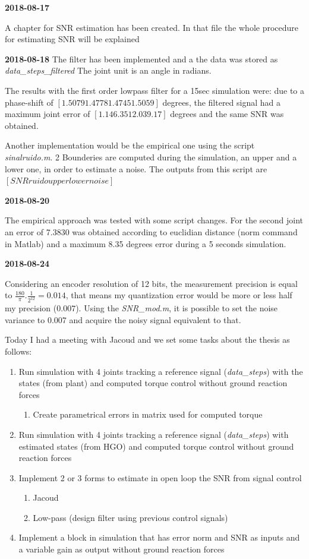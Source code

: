 \textbf{2018-08-17}

A chapter for SNR estimation has been created. In that file the whole procedure for estimating SNR will be explained 

\textbf{2018-08-18}
The filter has been implemented and a the data was stored as \textit{data\_steps\_filtered}
The joint unit is an angle in radians. 

The results with the first order lowpass filter for a 15sec simulation were: due to a phase-shift of $[1.5079  1.4778  1.4745  1.5059]$ degrees, the filtered signal had a maximum joint error of $[1.14   6.35    12.03    9.17]$ degrees and the same SNR was obtained. 

Another implementation would be the empirical one using the script \textit{sinalruido.m}. 2 Bounderies are computed during the simulation, an upper and a lower one, in order to estimate a noise. The outputs from this script are $[SNR ruido upper lower noise]$ 

\textbf{2018-08-20}

The empirical approach was tested with some script changes. For the second joint an error of 7.3830 was obtained according to euclidian distance (norm command in Matlab) and a maximum 8.35 degrees error during a 5 seconds simulation.

\textbf{2018-08-24}

Considering an encoder resolution of 12 bits, the measurement precision is equal to $\frac{180}{\pi}.\frac{1}{2^{12}} = 0.014$, that means my quantization error would be more or less half my precision ($0.007$). Using the \textit{SNR\_mod.m}, it is possible to set the noise variance to 0.007 and acquire the noisy signal equivalent to that.

Today I had a meeting with Jacoud and we set some tasks about the thesis as follows:

\begin{enumerate}
    \item Run simulation with 4 joints tracking a reference signal (\textit{data\_steps}) with the states (from plant) and computed torque control without ground reaction forces
    \begin{enumerate}
        \item Create parametrical errors in matrix used for computed torque
    \end{enumerate}
    \item Run simulation with 4 joints tracking a reference signal (\textit{data\_steps}) with estimated states (from HGO) and computed torque control without ground reaction forces
    \item Implement 2 or 3 forms to estimate in open loop the SNR from signal control
    \begin{enumerate}
        \item Jacoud
        \item Low-pass (design filter using previous control signals)
    \end{enumerate}
    \item Implement a block in simulation that has error norm and SNR as inputs and a variable gain as output without ground reaction forces
\end{enumerate}

